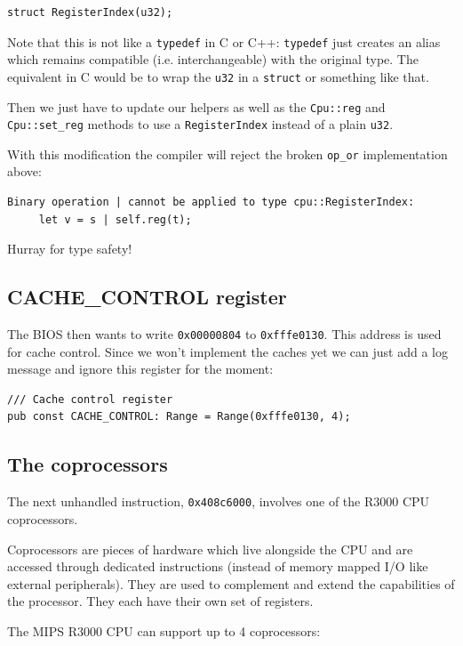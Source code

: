\documentclass[a4paper]{article}
\newcommand{\code}[1] {\texttt{#1}}
\begin{document}
\begin{lstlisting}
struct RegisterIndex(u32);
\end{lstlisting}

Note that this is not like a \code{typedef} in C or C++:
\code{typedef} just creates an alias which remains compatible
(i.e. interchangeable) with the original type. The equivalent in C
would be to wrap the \code{u32} in a \code{struct} or something like that.

Then we just have to update our helpers as well as the
\code{Cpu::reg} and \code{Cpu::set\_reg} methods to use a
\code{RegisterIndex} instead of a plain \code{u32}.

With this modification the compiler will reject the broken
\code{op\_or} implementation above:

\begin{verbatim}
Binary operation | cannot be applied to type cpu::RegisterIndex:
     let v = s | self.reg(t);
\end{verbatim}

Hurray for type safety!


\subsection{CACHE\_CONTROL register}

The BIOS then wants to write \code{0x00000804} to
\code{0xfffe0130}. This address is used for cache control. Since we
won't implement the caches yet we can just add a log message and
ignore this register for the moment:

\begin{lstlisting}
/// Cache control register
pub const CACHE_CONTROL: Range = Range(0xfffe0130, 4);
\end{lstlisting}

\subsection{The coprocessors}

The next unhandled instruction, \code{0x408c6000}, involves one of
the R3000 CPU coprocessors.

Coprocessors are pieces of hardware which live alongside the CPU and
are accessed through dedicated instructions (instead of memory mapped
I/O like external peripherals). They are used to complement and extend
the capabilities of the processor. They each have their own set of
registers.

The MIPS R3000 CPU can support up to 4 coprocessors:
\end{document}
